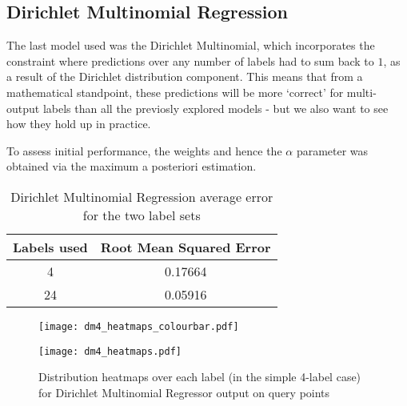 \subsection{Dirichlet Multinomial Regression}

The last model used was the Dirichlet Multinomial, which incorporates the constraint where predictions over any number of labels had to sum back to $1$, as a result of the Dirichlet distribution component. This means that from a mathematical standpoint, these predictions will be more `correct' for multi-output labels than all the previosly explored models - but we also want to see how they hold up in practice.

To assess initial performance, the weights and hence the $\alpha$ parameter was obtained via the maximum a posteriori estimation.


\begin{table}
    \centering
    \begin{tabular}{|c|c|}
        \hline
        Labels used & Root Mean Squared Error \\\hline
        4 & 0.17664\\
        24  & 0.05916\\
        \hline
    \end{tabular}
    \label{table:dmbasicresults}
    \caption{Dirichlet Multinomial Regression average error for the two label sets}
\end{table}

\begin{figure}
    \begin{minipage}{\linewidth}
        \centerline{\texttt{[image: dm4\_heatmaps\_colourbar.pdf]}}
        \centerline{\texttt{[image: dm4\_heatmaps.pdf]}}
        \caption{Distribution heatmaps over each label (in the simple 4-label case) for Dirichlet Multinomial Regressor output on query points}
        \label{fig:dm_4label_heatmap}
    \end{minipage}
    \hfill
\end{figure}

